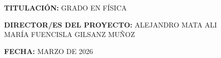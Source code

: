 \documentclass[11pt,a4paper]{report}
\newcommand{\TemplateText}[1]{\textcolor{UEred}{#1}}
\begin{document}
\vspace{0.8cm}
\TemplateText{\textbf{TITULACIÓN:} GRADO EN FÍSICA}

\vspace{0.8cm}
\TemplateText{\textbf{DIRECTOR/ES DEL PROYECTO:} ALEJANDRO MATA ALI}\\
\hspace*{5.5cm}\TemplateText{MARÍA FUENCISLA GILSANZ MUÑOZ}

\vspace{0.8cm}
\TemplateText{\textbf{FECHA:} MARZO DE 2026}

\clearpage























\end{document}
